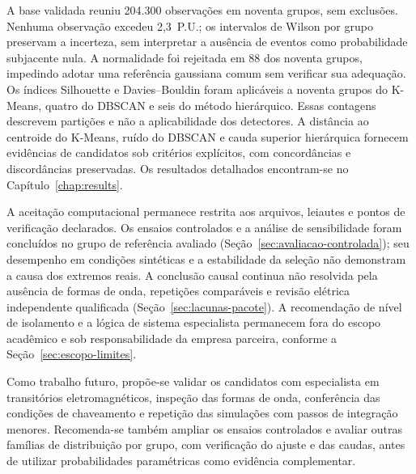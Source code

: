 \documentclass[
	12pt,				%
	openright,			%
	oneside,			%
	a4paper,			%
	chapter=TITLE,		%
	section=TITLE,		%
	subsection=TITLE,	%
	subsubsection=TITLE,%
	english,			%
	brazilian			%
	]{abntex2}
\theoremstyle{definition}
\begin{document}
A base validada reuniu 204.300 observações em noventa grupos, sem exclusões.
Nenhuma observação excedeu 2,3~P.U.; os intervalos de Wilson por grupo
preservam a incerteza, sem interpretar a ausência de eventos como
probabilidade subjacente nula. A normalidade foi rejeitada em 88 dos noventa
grupos, impedindo adotar uma referência gaussiana comum sem verificar sua
adequação. Os índices Silhouette e Davies--Bouldin foram aplicáveis a noventa
grupos do K-Means, quatro do DBSCAN e seis do método hierárquico. Essas
contagens descrevem partições e não a aplicabilidade dos detectores. A
distância ao centroide do K-Means, ruído do DBSCAN e cauda superior
hierárquica fornecem evidências de candidatos sob critérios explícitos,
com concordâncias e discordâncias preservadas.
Os resultados detalhados encontram-se no Capítulo~\ref{chap:results}.

A aceitação computacional permanece restrita aos arquivos, leiautes e pontos
de verificação declarados. Os ensaios controlados e a análise de sensibilidade
foram concluídos no grupo de referência avaliado
(Seção~\ref{sec:avaliacao-controlada}); seu desempenho em condições
sintéticas e a estabilidade da seleção não demonstram a causa dos extremos
reais. A conclusão causal continua não resolvida pela ausência de formas de
onda, repetições comparáveis e revisão elétrica independente qualificada
(Seção~\ref{sec:lacunas-pacote}). A recomendação de nível de isolamento e a
lógica de sistema especialista permanecem fora do escopo acadêmico e sob
responsabilidade da empresa parceira, conforme a
Seção~\ref{sec:escopo-limites}.

Como trabalho futuro, propõe-se validar os candidatos com especialista em
transitórios eletromagnéticos, inspeção das formas de onda, conferência das
condições de chaveamento e repetição das simulações com passos de integração
menores. Recomenda-se também ampliar os ensaios controlados e avaliar outras
famílias de distribuição por grupo, com verificação do ajuste e das caudas,
antes de utilizar probabilidades paramétricas como evidência complementar.

\postextual


\end{document}
